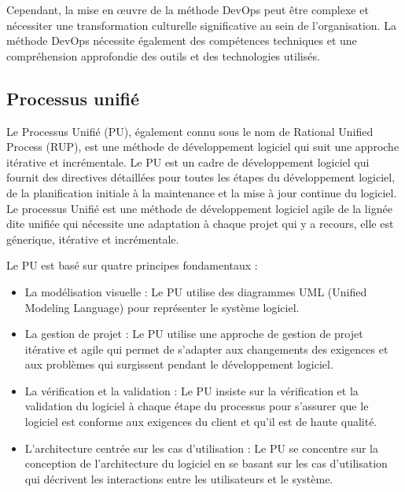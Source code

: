 Cependant, la mise en œuvre de la méthode DevOps peut être complexe et nécessiter une transformation culturelle significative au sein de l'organisation. La méthode DevOps nécessite également des compétences techniques et une compréhension approfondie des outils et des technologies utilisés.

\subsection{Processus unifié}\label{subsec:processus-unifie}
Le Processus Unifié (PU), également connu sous le nom de Rational Unified Process (RUP), est une méthode de développement logiciel qui suit une approche itérative et incrémentale. Le PU est un cadre de développement logiciel qui fournit des directives détaillées pour toutes les étapes du développement logiciel, de la planification initiale à la maintenance et la mise à jour continue du logiciel.
Le processus Unifié est une méthode de développement logiciel agile de la lignée dite unifiée
qui nécessite une adaptation à chaque projet qui y a recours, elle est génerique, itérative
et incrémentale.

Le PU est basé sur quatre principes fondamentaux :
\begin{itemize}
    \item La modélisation visuelle : Le PU utilise des diagrammes UML (Unified Modeling Language) pour représenter le système logiciel.
    \item La gestion de projet : Le PU utilise une approche de gestion de projet itérative et agile qui permet de s'adapter aux changements des exigences et aux problèmes qui surgissent pendant le développement logiciel.
    \item La vérification et la validation : Le PU insiste sur la vérification et la validation du logiciel à chaque étape du processus pour s'assurer que le logiciel est conforme aux exigences du client et qu'il est de haute qualité.
    \item L'architecture centrée sur les cas d'utilisation : Le PU se concentre sur la conception de l'architecture du logiciel en se basant sur les cas d'utilisation qui décrivent les interactions entre les utilisateurs et le système.
\end{itemize}

